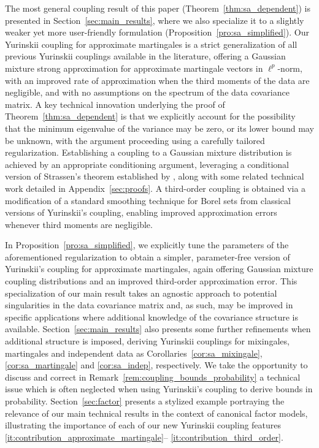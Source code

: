 The most general coupling result of this paper (Theorem~\ref{thm:sa_dependent})
is presented in Section~\ref{sec:main_results}, where we also specialize it to
a slightly weaker yet more user-friendly formulation
(Proposition~\ref{pro:sa_simplified}). Our Yurinskii coupling for approximate
martingales is a strict generalization of all previous Yurinskii couplings
available in the literature, offering a Gaussian mixture strong approximation
for approximate martingale vectors in $\ell^p$-norm, with an improved rate of
approximation when the third moments of the data are negligible, and with no
assumptions on the spectrum of the data covariance matrix. A key technical
innovation underlying the proof of Theorem~\ref{thm:sa_dependent} is that we
explicitly account for the possibility that the minimum eigenvalue of the
variance may be zero, or its lower bound may be unknown, with the argument
proceeding using a carefully tailored regularization. Establishing a coupling
to a Gaussian mixture distribution is achieved by an appropriate conditioning
argument, leveraging a conditional version of Strassen's theorem established by
\citet{chen2020jackknife}, along with some related technical work detailed in
Appendix~\ref{sec:proofs}.
A third-order coupling is obtained via a
modification of a standard smoothing technique for Borel sets from classical
versions of Yurinskii's coupling, enabling improved approximation errors
whenever third moments are negligible.

In Proposition~\ref{pro:sa_simplified}, we explicitly tune the parameters of
the aforementioned regularization to obtain a simpler, parameter-free version
of Yurinskii's coupling for approximate martingales, again offering Gaussian
mixture coupling distributions and an improved third-order approximation error.
This specialization of our main result takes an agnostic approach to potential
singularities in the data covariance matrix and, as such, may be improved in
specific applications where additional knowledge of the covariance structure is
available. Section~\ref{sec:main_results} also presents some further
refinements when additional structure is imposed, deriving Yurinskii couplings
for mixingales, martingales and independent data as
Corollaries~\ref{cor:sa_mixingale}, \ref{cor:sa_martingale} and
\ref{cor:sa_indep}, respectively. We take the opportunity to discuss and correct
in Remark~\ref{rem:coupling_bounds_probability} a technical issue which is
often neglected \citep{pollard2002user, li2020uniform} when using Yurinskii's
coupling to derive bounds in probability. Section~\ref{sec:factor} presents a
stylized example portraying the relevance of our main technical results in the
context of canonical factor models, illustrating the importance of each of our
new Yurinskii coupling features \ref{it:contribution_approximate_martingale}--%
\ref{it:contribution_third_order}.

